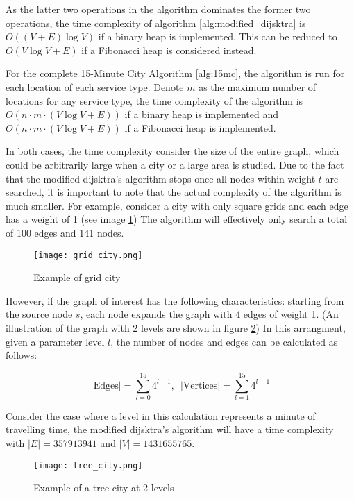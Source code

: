 As the latter two operations in the algorithm dominates the former two operations, the time complexity of algorithm \ref{alg:modified_dijsktra} is $O((V+E)\log V)$ if a binary heap is implemented. This can be reduced to $O(V\log V+E)$ if a Fibonacci heap is considered instead.

For the complete 15-Minute City Algorithm \ref{alg:15mc}, the algorithm is run for each location of each service type. Denote $m$ as the maximum number of locations for any service type, the time complexity of the algorithm is $O(n\cdot m\cdot(V\log V+E))$ if a binary heap is implemented and $O(n\cdot m\cdot(V\log V+E))$ if a Fibonacci heap is implemented. 

In both cases, the time complexity consider the size of the entire graph, which could be arbitrarily large when a city or a large area is studied. Due to the fact that the modified dijsktra's algorithm stops once all nodes within weight $t$ are searched, it is important to note that the actual complexity of the algorithm is much smaller. For example, consider a city with only square grids and each edge has a weight of 1 (see image \ref{fig:grid_city}) The algorithm will effectively only search a total of 100 edges and 141 nodes.

\begin{figure}[h]
    \caption{Example of grid city}
    \centering
    \texttt{[image: grid\_city.png]}
    \label{fig:grid_city}
\end{figure}

However, if the graph of interest has the following characteristics: starting from the source node $s$, each node expands the graph with 4 edges of weight 1. (An illustration of the graph with 2 levels are shown in figure \ref{fig:tree_city}) In this arrangment, given a parameter level $l$, the number of nodes and edges can be calculated as follows:

$$|\text{Edges}|=\sum^{15}_{l=0}4^{l-1},\enspace|\text{Vertices}|=\sum^{15}_{l=1}4^{l-1}$$

Consider the case where a level in this calculation represents a minute of travelling time, the modified dijsktra's algorithm will have a time complexity with $|E|=357913941$ and $|V|=1431655765$.

\begin{figure}[h]
    \caption{Example of a tree city at 2 levels}
    \centering
    \texttt{[image: tree\_city.png]}
    \label{fig:tree_city}
\end{figure}

